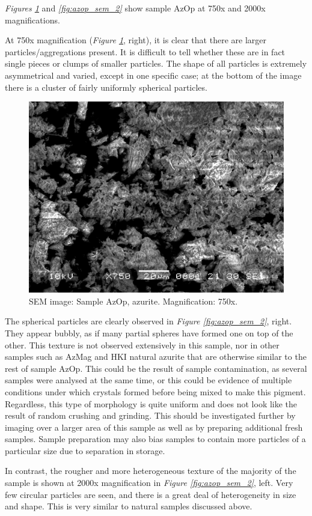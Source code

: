 
\textit{Figures \ref{fig:azop_sem_1}} and \textit{\ref{fig:azop_sem_2}} show sample AzOp at 750x and 2000x magnifications. 

At 750x magnification (\textit{Figure \ref{fig:azop_sem_1}}, right), it is clear that there are larger particles/aggregations present. It is difficult to tell whether these are in fact single pieces or clumps of smaller particles. The shape of all particles is extremely asymmetrical and varied, except in one specific case; at the bottom of the image there is a cluster of fairly uniformly spherical particles. 

\begin{figure}[H]
\centering
  \includegraphics[width=.45\linewidth]{AzOp_x750_2_150321}
\caption[SEM image: Sample AzOp, azurite]{SEM image: Sample AzOp, azurite. Magnification: 750x.}
\label{fig:azop_sem_1}
\end{figure}

The spherical particles are clearly observed in \textit{Figure \ref{fig:azop_sem_2}}, right. They appear bubbly, as if many partial spheres have formed one on top of the other. This texture is not observed extensively in this sample, nor in other samples such as AzMag and HKI natural azurite that are otherwise similar to the rest of sample AzOp. This could be the result of sample contamination, as several samples were analysed at the same time, or this could be evidence of multiple conditions under which crystals formed before being mixed to make this pigment. Regardless, this type of morphology is quite uniform and does not look like the result of random crushing and grinding. This should be investigated further by imaging over a larger area of this sample as well as by preparing additional fresh samples. Sample preparation may also bias samples to contain more particles of a particular size due to separation in storage.

In contrast, the rougher and more heterogeneous texture of the majority of the sample is shown at 2000x magnification in \textit{Figure \ref{fig:azop_sem_2}}, left. Very few circular particles are seen, and there is a great deal of heterogeneity in size and shape. This is very similar to natural samples discussed above.

